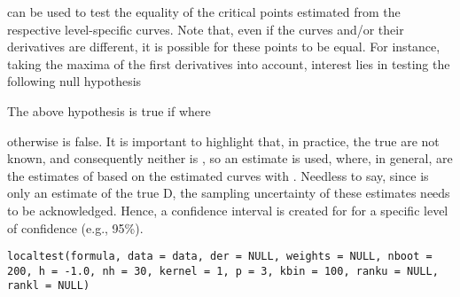 %
\begin{Description}\relax
{} can be used to test the equality of the  critical points estimated from the respective level-specific curves. Note that, even if the curves and/or their derivatives are different, it is possible for these points to be equal. 
For instance, taking the maxima of the first derivatives into account, interest lies in testing the following null hypothesis

The above hypothesis is true if  where 


otherwise  is false. It is important to highlight that, in practice, the true  are not known, and consequently neither is , so an estimate  is used, where, in general,  are the estimates of  based on the estimated curves  with .
Needless to say, since  is only an estimate of the true D, the sampling uncertainty of these estimates needs to be acknowledged. Hence, a confidence interval  is created for  for a specific level of confidence (e.g., 95\%). 
\end{Description}
%
\begin{Usage}
\begin{verbatim}
localtest(formula, data = data, der = NULL, weights = NULL, nboot = 200, h = -1.0, nh = 30, kernel = 1, p = 3, kbin = 100, ranku = NULL, rankl = NULL)
\end{verbatim}
\end{Usage}
%
